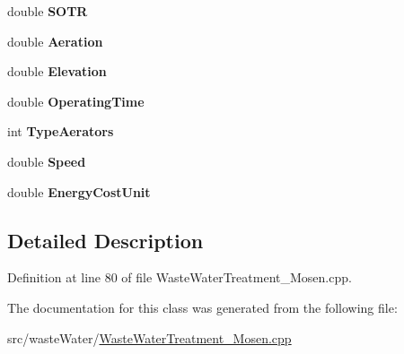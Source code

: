 \begin{DoxyCompactItemize}
\mbox{\label{classinput_table_af89e1dc4dda1116b5ee13ddf5d4f8f20}} 
double {\bfseries S\+O\+TR}
\item 
\mbox{\label{classinput_table_a2babdd5ca6cc17264cb875e6146d6031}} 
double {\bfseries Aeration}
\item 
\mbox{\label{classinput_table_aed506374f47d3fa2c58b65fdd4d4ff24}} 
double {\bfseries Elevation}
\item 
\mbox{\label{classinput_table_a531c11428319654282d9371e86eede1f}} 
double {\bfseries Operating\+Time}
\item 
\mbox{\label{classinput_table_a380e1702f9e7360270a42e84b29e40a8}} 
int {\bfseries Type\+Aerators}
\item 
\mbox{\label{classinput_table_a0a2aaefbe624ec6f473e13b6845c7368}} 
double {\bfseries Speed}
\item 
\mbox{\label{classinput_table_a04f621418a79ef2e9f632ba4cdb8ff04}} 
double {\bfseries Energy\+Cost\+Unit}
\end{DoxyCompactItemize}


\subsection{Detailed Description}


Definition at line 80 of file Waste\+Water\+Treatment\+\_\+\+Mosen.\+cpp.



The documentation for this class was generated from the following file\+:\begin{DoxyCompactItemize}
\item 
src/waste\+Water/\hyperlink{_waste_water_treatment___mosen_8cpp}{Waste\+Water\+Treatment\+\_\+\+Mosen.\+cpp}\end{DoxyCompactItemize}
